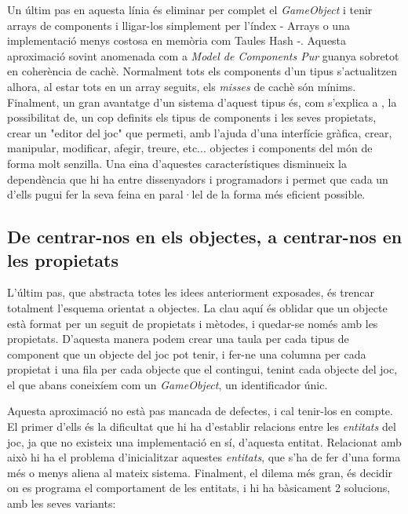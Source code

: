 Un últim pas en aquesta línia és eliminar per complet el {\em GameObject} i tenir arrays de components i lligar-los simplement per l'índex - Arrays o una implementació menys costosa en memòria com Taules Hash -. Aquesta aproximació sovint anomenada com a {\em Model de Components Pur} guanya sobretot en coherència de cachè. Normalment tots els components d'un tipus s'actualitzen alhora, al estar tots en un array seguits, els {\em misses} de cachè són mínims.
\\

Finalment, un gran avantatge d'un sistema d'aquest tipus és, com s'explica a \cite{Leonard99}, la possibilitat de, un cop definits els tipus de components i les seves propietats, crear un "editor del joc" que permeti, amb l'ajuda d'una interfície gràfica, crear, manipular, modificar, afegir, treure, etc... objectes i components del món de forma molt senzilla. Una eina d'aquestes característiques disminueix la dependència que hi ha entre dissenyadors i programadors i permet que cada un d'ells pugui fer la seva feina en paral·lel de la forma més eficient possible.

\subsection{De centrar-nos en els objectes, a centrar-nos en les propietats}

L'últim pas, que abstracta totes les idees anteriorment exposades, és trencar totalment l'esquema orientat a objectes. La clau aquí és oblidar que un objecte està format per un seguit de propietats i mètodes, i quedar-se només amb les propietats. D'aquesta manera podem crear una taula per cada tipus de component que un objecte del joc pot tenir, i fer-ne una columna per cada propietat i una fila per cada objecte que el contingui, tenint cada objecte del joc, el que abans coneixíem com un {\em GameObject}, un identificador únic.

Aquesta aproximació no està pas mancada de defectes, i cal tenir-los en compte. El primer d'ells és la dificultat que hi ha d'establir relacions entre les {\em entitats} del joc, ja que no existeix una implementació en sí, d'aquesta entitat. Relacionat amb això hi ha el problema d'inicialitzar aquestes {\em entitats}, que s'ha de fer d'una forma més o menys aliena al mateix sistema. Finalment, el dilema més gran, és decidir on es programa el comportament de les entitats, i hi ha bàsicament 2 solucions, amb les seves variants:

